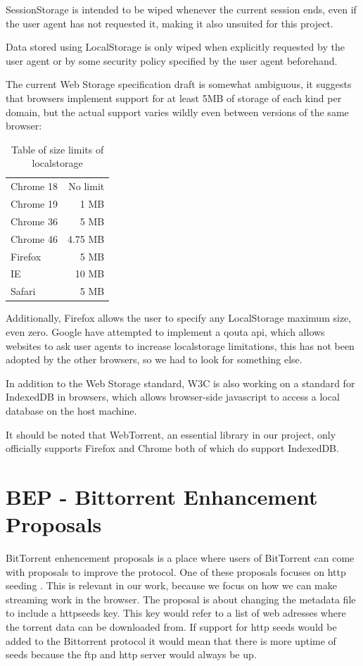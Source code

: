 SessionStorage is intended to be wiped whenever the current session ends, 
even if the user agent has not requested it, making it also unsuited for this project.

Data stored using LocalStorage is only wiped when explicitly requested by the user agent or 
by some security policy specified by the user agent beforehand.
\newline

The current Web Storage specification draft is somewhat ambiguous, 
it suggests that browsers implement support for at least 5MB of storage of each kind per domain,
but the actual support varies wildly even between versions of the same browser:

\begin{table}[h]
	\centering
	\begin{tabular}{l | r}
		Chrome 18 & No limit  \\
		Chrome 19 & 1    MB   \\
		Chrome 36 & 5    MB   \\
		Chrome 46 & 4.75 MB   \\
		Firefox   & 5    MB   \\
		IE        & 10   MB   \\
		Safari    & 5    MB   \\
	\end{tabular}
	\caption{Table of size limits of localstorage}
	\label{table:browserls}
\end{table}

Additionally, Firefox allows the user to specify any LocalStorage maximum size, even zero. 
Google have attempted to implement a qouta api, 
which allows websites to ask user agents to increase localstorage limitations,
this has not been adopted by the other browsers, so we had to look for something else.
\newline

In addition to the Web Storage standard, W3C is also working on a standard for IndexedDB in browsers, 
which allows browser-side javascript to access a local database on the host machine.

It should be noted that WebTorrent, 
an essential library in our project, 
only officially supports Firefox and Chrome 
both of which do support IndexedDB.
\newline

\section{BEP - Bittorrent Enhancement Proposals}
BitTorrent enhencement proposals is a place where users of BitTorrent can come with proposals to improve the protocol.
One of these proposals focuses on http seeding \citep{bittorrent:bep17}.
This is relevant in our work, because we focus on how we can make streaming work in the browser. The proposal is about changing the metadata file to include a httpseeds key. This key would refer to a list of web adresses where the torrent data can be downloaded from.
If support for http seeds would be added to the Bittorrent protocol it would mean that there is more uptime of seeds because the ftp and http server would always be up.

